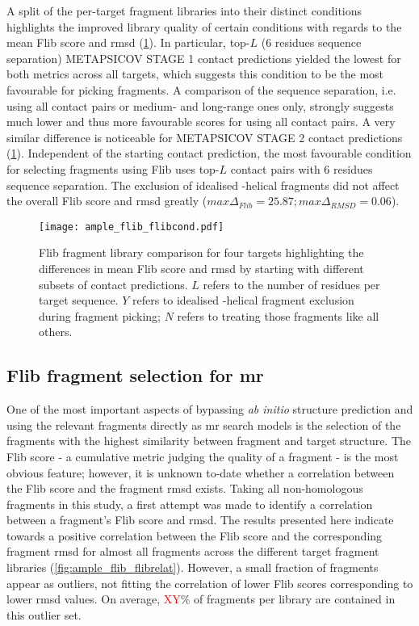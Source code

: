 A split of the per-target fragment libraries into their distinct conditions highlights the improved library quality of certain conditions with regards to the mean Flib score and \gls{rmsd} (\cref{fig:ample_flib_flibcond}). In particular, top-$L$ (6 residues sequence separation) METAPSICOV STAGE 1 contact predictions yielded the lowest for both metrics across all targets, which suggests this condition to be the most favourable for picking fragments. A comparison of the sequence separation, i.e. using all contact pairs or medium- and long-range ones only, strongly suggests much lower and thus more favourable scores for using all contact pairs. A very similar difference is noticeable for METAPSICOV STAGE 2 contact predictions (\cref{fig:ample_flib_flibcond}). Independent of the starting contact prediction, the most favourable condition for selecting fragments using Flib uses top-$L$ contact pairs with 6 residues sequence separation. The exclusion of idealised \textalpha-helical fragments did not affect the overall Flib score and \gls{rmsd} greatly ($max \Delta_{Flib}=25.87; max \Delta_{RMSD}=0.06$).

\begin{figure}[H]
	\centering
	\texttt{[image: ample\_flib\_flibcond.pdf]}
	\caption[Flib fragment library comparison]{Flib fragment library comparison for four targets highlighting the differences in mean Flib score and \gls{rmsd} by starting with different subsets of contact predictions. $L$ refers to the number of residues per target sequence. $Y$ refers to idealised \textalpha-helical fragment exclusion during fragment picking; $N$ refers to treating those fragments like all others.}
	\label{fig:ample_flib_flibcond}
\end{figure}

\subsection{Flib fragment selection for \acrlong{mr}}

One of the most important aspects of bypassing \textit{ab initio} structure prediction and using the relevant fragments directly as \gls{mr} search models is the selection of the fragments with the highest similarity between fragment and target structure. The Flib score - a cumulative metric judging the quality of a fragment - is the most obvious feature; however, it is unknown to-date whether a correlation between the Flib score and the fragment \gls{rmsd} exists. Taking all non-homologous fragments in this study, a first attempt was made to identify a correlation between a fragment's Flib score and \gls{rmsd}. The results presented here indicate towards a positive correlation between the Flib score and the corresponding fragment \gls{rmsd} for almost all fragments across the different target fragment libraries (\cref{fig:ample_flib_flibrelat}). However, a small fraction of fragments appear as outliers, not fitting the correlation of lower Flib scores corresponding to lower \gls{rmsd} values. On average, \textcolor{red}{XY}\% of fragments per library are contained in this outlier set.

